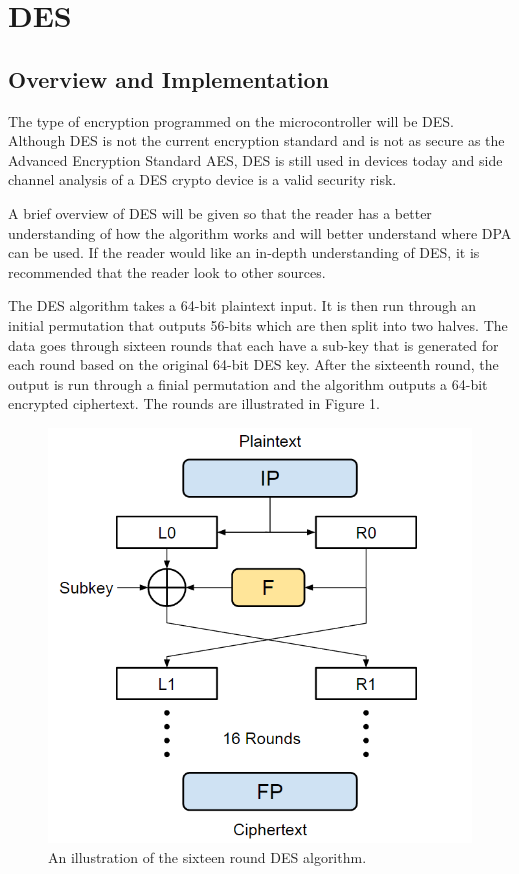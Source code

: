 \documentclass[letterpaper, 10 pt, conference]{ieeeconf}  %
\begin{document}
\section{DES}

\subsection{Overview and Implementation}

The type of encryption programmed on the microcontroller will be DES.  Although DES is not the current encryption standard and is not as secure as the Advanced Encryption Standard AES, DES is still used in devices today and side channel analysis of a DES crypto device is a valid security risk.

A brief overview of DES will be given so that the reader has a better understanding of how the algorithm works and will better understand where DPA can be used.  If the reader would like an in-depth understanding of DES, it is recommended that the reader look to other sources.

The DES algorithm takes a 64-bit plaintext input.  It is then run through an initial permutation that outputs 56-bits which are then split into two halves.  The data goes through sixteen rounds that each have a sub-key that is generated for each round based on the original 64-bit DES key.  After the sixteenth round, the output is run through a finial permutation and the algorithm outputs a 64-bit encrypted ciphertext.  The rounds are illustrated in Figure 1.

\begin{figure}[thpb]
	\centering
	\includegraphics[scale=.50]{DesRounds}
    \caption{An illustration of the sixteen round DES algorithm.}
\end{figure}
\end{document}

